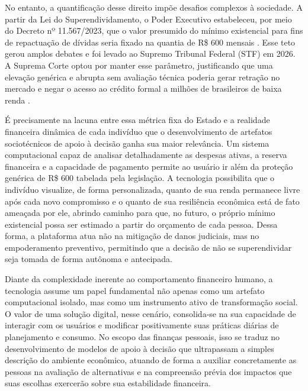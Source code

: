 \documentclass[portuguese]{sbc2025}%
\begin{document}
No entanto, a quantificação desse direito impõe desafios complexos à sociedade. A partir da Lei do Superendividamento, o Poder Executivo estabeleceu, por meio do Decreto nº 11.567/2023, que o valor presumido do mínimo existencial para fins de repactuação de dívidas seria fixado na quantia de R\$ 600 mensais \citep{decreto11567}. Esse teto gerou amplos debates e foi levado ao Supremo Tribunal Federal (STF) em 2026. A Suprema Corte optou por manter esse parâmetro, justificando que uma elevação genérica e abrupta sem avaliação técnica poderia gerar retração no mercado e negar o acesso ao crédito formal a milhões de brasileiros de baixa renda \citep{stf2026}.

É precisamente na lacuna entre essa métrica fixa do Estado e a realidade financeira dinâmica de cada indivíduo que o desenvolvimento de artefatos sociotécnicos de apoio à decisão ganha sua maior relevância. Um sistema computacional capaz de analisar detalhadamente as despesas ativas, a reserva financeira e a capacidade de pagamento permite ao usuário ir além da proteção genérica de R\$ 600 tabelada pela legislação. A tecnologia possibilita que o indivíduo visualize, de forma personalizada, quanto de sua renda permanece livre após cada novo compromisso e o quanto de sua resiliência econômica está de fato ameaçada por ele, abrindo caminho para que, no futuro, o próprio mínimo existencial possa ser estimado a partir do orçamento de cada pessoa. Dessa forma, a plataforma atua não na mitigação de danos judiciais, mas no empoderamento preventivo, permitindo que a decisão de não se superendividar seja tomada de forma autônoma e antecipada.

Diante da complexidade inerente ao comportamento financeiro humano, a tecnologia assume um papel fundamental não apenas como um artefato computacional isolado, mas como um instrumento ativo de transformação social. O valor de uma solução digital, nesse cenário, consolida-se na sua capacidade de interagir com os usuários e modificar positivamente suas práticas diárias de planejamento e consumo. No escopo das finanças pessoais, isso se traduz no desenvolvimento de modelos de apoio à decisão que ultrapassam a simples descrição do ambiente econômico, atuando de forma a auxiliar concretamente as pessoas na avaliação de alternativas e na compreensão prévia dos impactos que suas escolhas exercerão sobre sua estabilidade financeira.
\end{document}
